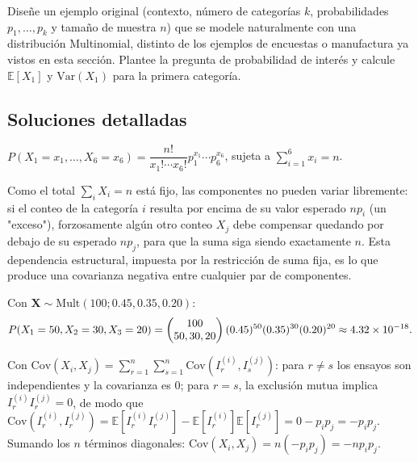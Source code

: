 \begin{problema}
	\label{prob:858a3a8}
	Diseñe un ejemplo original (contexto, número de categorías $k$, probabilidades $p_1,\dots,p_k$ y tamaño de muestra $n$) que se modele naturalmente con una distribución Multinomial, distinto de los ejemplos de encuestas o manufactura ya vistos en esta sección. Plantee la pregunta de probabilidad de interés y calcule $\mathbb{E}[X_1]$ y $\text{Var}(X_1)$ para la primera categoría.
\end{problema}

\subsection*{Soluciones detalladas}

\begin{solproblema}[prob:2499194]
	$P(X_1=x_1,\dots,X_6=x_6) = \dfrac{n!}{x_1!\cdots x_6!}p_1^{x_1}\cdots p_6^{x_6}$, sujeta a $\sum_{i=1}^6 x_i = n$.
\end{solproblema}

\begin{solproblema}[prob:97df06e]
	Como el total $\sum_i X_i = n$ está fijo, las componentes no pueden variar libremente: si el conteo de la categoría $i$ resulta por encima de su valor esperado $np_i$ (un "exceso"), forzosamente algún otro conteo $X_j$ debe compensar quedando por debajo de su esperado $np_j$, para que la suma siga siendo exactamente $n$. Esta dependencia estructural, impuesta por la restricción de suma fija, es lo que produce una covarianza negativa entre cualquier par de componentes.
\end{solproblema}

\begin{solproblema}[prob:33bf5d2]
	Con $\bm{X}\sim\text{Mult}(100; 0.45,0.35,0.20)$:
	\begin{align*}
		P(X_1=50,X_2=30,X_3=20) = \begin{pmatrix} 100 \\ 50,30,20\end{pmatrix}(0.45)^{50}(0.35)^{30}(0.20)^{20} \approx 4.32\times10^{-18}.
	\end{align*}
\end{solproblema}

\begin{solproblema}[prob:277341a]
	Con $\text{Cov}(X_i,X_j) = \sum_{r=1}^n\sum_{s=1}^n \text{Cov}(I_r^{(i)}, I_s^{(j)})$: para $r\neq s$ los ensayos son independientes y la covarianza es $0$; para $r=s$, la exclusión mutua implica $I_r^{(i)}I_r^{(j)}=0$, de modo que $\text{Cov}(I_r^{(i)},I_r^{(j)}) = \mathbb{E}[I_r^{(i)}I_r^{(j)}]-\mathbb{E}[I_r^{(i)}]\mathbb{E}[I_r^{(j)}] = 0-p_ip_j = -p_ip_j$. Sumando los $n$ términos diagonales: $\text{Cov}(X_i,X_j) = n(-p_ip_j) = -np_ip_j$.
\end{solproblema}

